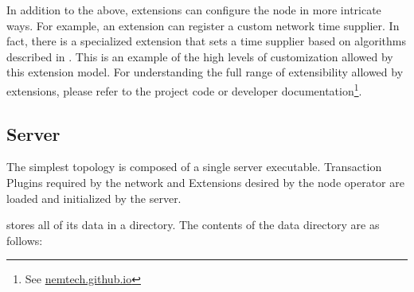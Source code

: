 In addition to the above, extensions can configure the node in more intricate ways.
For example, an extension can register a custom network time supplier.
In fact, there is a specialized extension that sets a time supplier based on algorithms described in .
This is an example of the high levels of customization allowed by this extension model.
For understanding the full range of extensibility allowed by extensions, please refer to the project code or developer documentation\footnote{See \url{nemtech.github.io}}.

\subsection{Server}

The simplest \codenamespace topology is composed of a single server executable.
Transaction Plugins required by the network and \codenamespace Extensions desired by the node operator are loaded and initialized by the server.

\codenamespace stores all of its data in a  directory.
The contents of the data directory are as follows:

